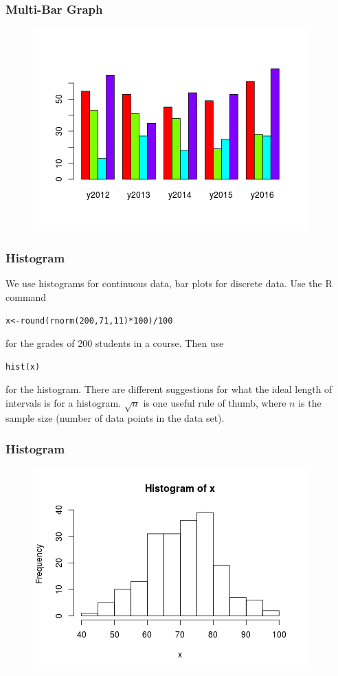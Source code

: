 \documentclass[xcolor=dvipsnames]{beamer}
\begin{document}
\begin{frame}
  \frametitle{Multi-Bar Graph}
\begin{figure}[h]
\includegraphics[scale=.8]{./diagrams/mbg.png}
\end{figure}
\end{frame}

\begin{frame}
  \frametitle{Histogram}
We use histograms for continuous data, bar plots for discrete data.
Use the R command
\begin{alltt}
  x<-round(rnorm(200,71,11)*100)/100
\end{alltt}
for the grades of 200 students in a course. Then use
\begin{alltt}
  hist(x)
\end{alltt}
for the histogram. There are different suggestions for what the ideal
length of intervals is for a histogram. $\sqrt{n}$ is one useful rule
of thumb, where $n$ is the sample size (number of data points in the
data set). 
\end{frame}

\begin{frame}
  \frametitle{Histogram}
\begin{figure}[h]
\includegraphics[scale=.8]{./diagrams/histogram.png}
\end{figure}
\end{frame}
\end{document}
